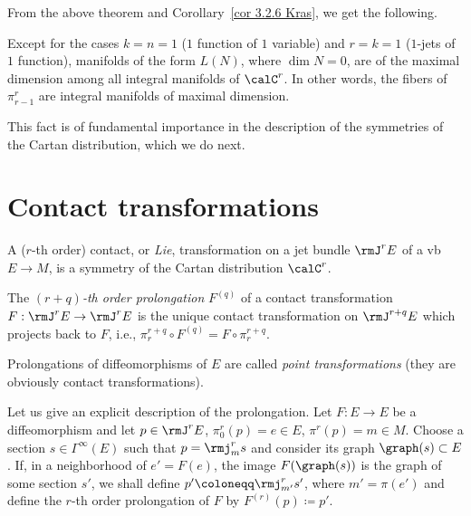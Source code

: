 From the above theorem and Corollary~\ref{cor 3.2.6 Kras}, we get the following.

\begin{cor}\label{cor 3.2.9 Kras}
    Except for the cases $k=n=1$ ($1$ function of $1$ variable) and $r=k=1$ ($1$-jets of $1$ function), manifolds of the form $L(N)$, where $\dim N=0$, are of the maximal dimension among all integral manifolds of $\calC^r$. In other words, the fibers of $\pi^r_{r-1}$ are integral manifolds of maximal dimension.
\end{cor}

This fact is of fundamental importance in the description of the symmetries of the Cartan distribution, which we do next.







\section{Contact transformations}

\begin{defn}
    A ($r$-th order) contact, or \emph{Lie}, transformation on a jet bundle $\rmJ^r E$ of a \gls{vb} $E\to M$, is a symmetry of the Cartan distribution $\calC^r$.

    The \emph{$(r+q)$-th order prolongation} $F^{(q)}$ of a contact transformation $F:\rmJ^rE\to \rmJ^rE$ is the unique contact transformation on $\rmJ^{r+q}E$ which projects back to $F$, i.e., $\pi^{r+q}_r\circ F^{(q)}=F\circ \pi^{r+q}_r$.

    Prolongations of diffeomorphisms of $E$ are called \emph{point transformations} (they are obviously contact transformations).
\end{defn}

\begin{rem}
    Let us give an explicit description of the prolongation. Let $F:E\to E$ be a diffeomorphism and let $p\in \rmJ^r E$, $\pi^r_0(p)=e\in E$, $\pi^r(p)=m\in M$. Choose a section $s\in\Gamma^\infty(E)$ such that $p=\rmj_m^r s$ and consider its graph $\graph(s)\subset E$. If, in a neighborhood of $e'=F(e)$, the image $F(\graph(s))$ is the graph of some section $s'$, we shall define $p'\coloneqq \rmj_{m'}^r s'$, where $m'=\pi(e')$ and define the $r$-th order prolongation of $F$ by $F^{(r)}(p)\coloneqq p'$.
\end{rem}


